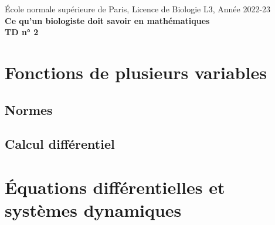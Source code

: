\documentclass[french, 12pt]{article}
\numberwithin{exercise}{section}
\numberwithin{equation}{section}
\begin{document}

\begin{center}
  \small{\sc \'Ecole normale supérieure de Paris, Licence de Biologie L3, Année 2022-23} \\
  \bigskip
  \large{\bf Ce qu'un biologiste doit savoir en mathématiques} \\
  \bigskip  
  {\bf TD n° 2}
\end{center}

\section{Fonctions de plusieurs variables} 
\newcommand{\multivar}{/home/robin/ENSEIGN/Cours/MathBiologie/L3-ENS-Math1/Exercices/MultiVar}

\subsection{Normes}





\subsection{Calcul différentiel}





\section{\'Equations différentielles et systèmes dynamiques} 
\newcommand{\equadiff}{/home/robin/ENSEIGN/Cours/MathBiologie/L3-ENS-Math1/Exercices/EquaDiff}
\end{document}
